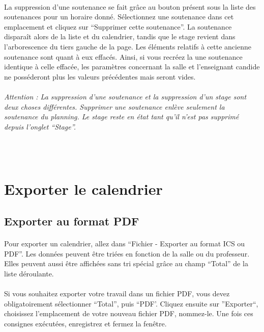 \documentclass[a4paper,10pt]{book}
\begin{document}
      \paragraph{}
	La suppression d'une soutenance se fait grâce au bouton présent sous la liste des soutenances pour un horaire donné.
	Sélectionnez une soutenance dans cet emplacement et cliquez sur ``Supprimer cette soutenance''.
	La soutenance disparaît alors de la liste et du calendrier, tandis que le stage revient dans l'arborescence du tiers gauche de la page.
	Les éléments relatifs à cette ancienne soutenance sont quant à eux effacés.
	Ainsi, si vous recréez la une soutenance identique à celle effacée, les paramètres concernant la salle et l'enseignant candide ne posséderont plus les valeurs précédentes mais seront vides.
	
      \paragraph{}
	\textit{Attention : La suppression d'une soutenance et la suppression d'un stage sont deux choses différentes. Supprimer une soutenance enlève seulement la soutenance du planning. Le stage reste en état tant qu'il n'est pas supprimé depuis l'onglet ``Stage''.}
      
      ~\\~\\
    \section{Exporter le calendrier}
      \subsection{Exporter au format PDF}
      
	\paragraph{}
	  Pour exporter un calendrier, allez dans ``Fichier - Exporter au format ICS ou PDF''.
	  Les données peuvent être triées en fonction de la salle ou du professeur.
	  Elles peuvent aussi être affichées sans tri spécial grâce au champ ``Total'' de la liste déroulante.
	  
	\paragraph{}
	  Si vous souhaitez exporter votre travail dans un fichier PDF, vous devez obligatoirement sélectionner ``Total'', puis ``PDF'.
	  Cliquez ensuite sur ''Exporter``, choisissez l'emplacement de votre nouveau fichier PDF, nommez-le.
	  Une fois ces consignes exécutées, enregistrez et fermez la fenêtre.
	
\end{document}
